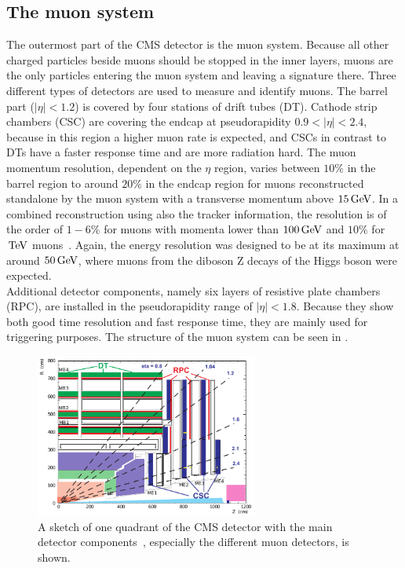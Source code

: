 \subsection{The muon system}
The outermost part of the CMS detector is the muon system. Because all other charged particles beside muons should be stopped in the inner layers, muons are the only particles entering the muon system and leaving a signature there. Three different types of detectors are used to measure and identify muons. The barrel part ($|\eta|<1.2$) is covered by four stations of drift tubes (DT). Cathode strip chambers (CSC) are covering the endcap at pseudorapidity $0.9<|\eta|<2.4$, because in this region a higher muon rate is expected, and CSCs in contrast to DTs have a faster response time and are more radiation hard.
The muon momentum resolution, dependent on the $\eta$ region, varies between $10\%$ in the barrel region to around $20\%$ in the endcap region for muons reconstructed standalone by the muon system with a transverse momentum above $15\,\text{Ge\hspace{-.08em}V}$.
In a combined reconstruction using also the tracker information, the resolution is of the order of $1-6\%$ for muons with momenta lower than $100\,\text{Ge\hspace{-.08em}V}$ and $10\%$ for $\,\text{Te\hspace{-.08em}V}$ muons~\cite{MuonPerformance}.
Again, the energy resolution was designed to be at its maximum at around $50\,\text{Ge\hspace{-.08em}V}$, where muons from the diboson Z decays of the Higgs boson were expected.\\
Additional detector components, namely six layers of resistive plate chambers (RPC), are installed in the pseudorapidity range of $|\eta|<1.8$. Because they show both good time resolution and fast response time, they are mainly used for triggering purposes. The structure of the muon system can be seen in .
\begin{figure}[tbp]
 \centering
 \includegraphics[width=0.65\textwidth]{figures/general/muonChamber}
 \caption{A sketch of one quadrant of the CMS detector with the main detector components~\cite{CMSTDR}, especially the different muon detectors, is shown.}
 \label{fig:etaPlaneCMSTotal}
\end{figure}
